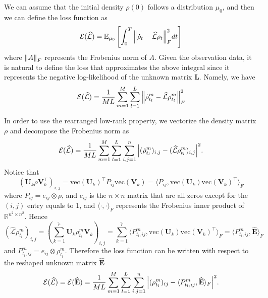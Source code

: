 \documentclass[10pt]{article}  %
\theoremstyle{plain}
\numberwithin{equation}{section}
\newcommand{\innerp}[1]{\langle{#1}\rangle}
\def\mL{\mathcal{L}}
\def\mE{\mathcal{E}}
\def\R{\mathbb{R}}
\newcommand{\bL}{\mathbf{L}}
\newcommand{\bV}{\mathbf{V}}
\newcommand{\bU}{\mathbf{U}}
\newcommand{\bE}{\mathbf{E}}
\renewcommand{\vec}{\text{vec}}
\renewcommand{\R}{\mathbb{R}}
\begin{document}
We can assume that the initial density $\rho(0)$ follows a distribution $\mu_0$, and then we can define the loss function as
\begin{equation}
	\mE(\widehat{\mL}) = \mathbb{E}_{\mu_0}\left[\int_0^T \norm{\dot{\rho}_t - \widehat{\mL}\rho_t }_F^2 dt\right]
\end{equation}
where $\norm{A}_F$ represents the Frobenius norm of $A$. Given the observation data, it is natural to define the loss that approximates the above integral since it represents the negative log-likelihood of the unknown matrix $\bL$. Namely, we have 
\begin{equation}
	\mE(\widehat{\mL}) = \frac{1}{ML}\sum_{m = 1}^M\sum_{l = 1}^L \norm{\dot{\rho}^{m}_{t_l} - \widehat{\mL}\rho^m_{t_l} }_F^2
\end{equation}

In order to use the rearranged low-rank property, we vectorize the density matrix $\rho$ and decompose the Frobenius norm as 
\begin{equation}
	\mE(\widehat{\mL}) = \frac{1}{ML}\sum_{m = 1}^M\sum_{l = 1}^L\sum_{i, j = 1}^n \abs{(\dot{\rho}^{m}_{t_l})_{i, j } - (\widehat{\mL}\rho^m_{t_l})_{i, j}}^2.
\end{equation}
Notice that 
\begin{equation}
	(\bU_k\rho \bV_k^\top)_{i, j} = \vec(\bU_k)^\top P_{ij} \vec(\bV_k) = \innerp{P_{ij}, \vec(\bU_k)\vec(\bV_k)^\top}_F
\end{equation}
where $P_{ij} = e_{ij} \otimes \rho$, and $e_{ij}$ is the $n\times n$ matrix that are all zeros except for the $(i, j)$ entry equals to 1, and $\innerp{\cdot, \cdot}_F$ represents the Frobenius inner product of $\R^{n^2\times n^2}$. Hence 
\begin{equation}
	(\widehat{\mL}\rho^m_{t_l})_{i, j} = \left(\sum_{k = 1}^{\widetilde{r}}\bU_k\rho^m_{t_l}\bV_k\right)_{i, j} = \sum_{k = 1}^{\widetilde{r}}\innerp{P^m_{t_l, ij}, \vec(\bU_k)\vec(\bV_k)^\top}_F = \innerp{P^m_{t_l, ij}, \widehat{\bE}}_F
\end{equation}
and $P^m_{t_l, ij} = e_{ij}\otimes \rho^m_{t_l}$.
Therefore the loss function can be written with respect to the reshaped unknown matrix $\widehat{\bE}$
\begin{equation}
	\mE(\widehat{\mL}) = \mE(\widehat{\bE}) = \frac{1}{ML}\sum_{m = 1}^M\sum_{l = 1}^L\sum_{i, j = 1}^n \abs{(\rho^m_{t_l})_{ij} - \innerp{P^m_{t_l, ij}, \widehat{\bE}}_F}^2.
\end{equation}
\end{document}
